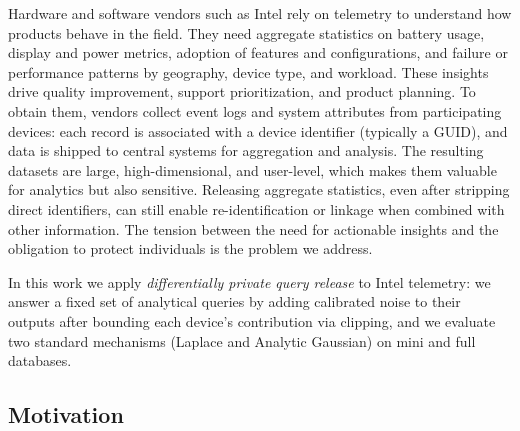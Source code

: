 \documentclass[12pt,letterpaper]{article}
\begin{document}
Hardware and software vendors such as Intel rely on telemetry to understand how products behave in the field. They need aggregate statistics on battery usage, display and power metrics, adoption of features and configurations, and failure or performance patterns by geography, device type, and workload. These insights drive quality improvement, support prioritization, and product planning. To obtain them, vendors collect event logs and system attributes from participating devices: each record is associated with a device identifier (typically a GUID), and data is shipped to central systems for aggregation and analysis. The resulting datasets are large, high-dimensional, and user-level, which makes them valuable for analytics but also sensitive. Releasing aggregate statistics, even after stripping direct identifiers, can still enable re-identification or linkage when combined with other information. The tension between the need for actionable insights and the obligation to protect individuals is the problem we address.

In this work we apply \emph{differentially private query release} to Intel telemetry: we answer a fixed set of analytical queries by adding calibrated noise to their outputs after bounding each device's contribution via clipping, and we evaluate two standard mechanisms (Laplace and Analytic Gaussian) on mini and full databases.

\subsection{Motivation}
\label{sec:motivation}
\end{document}
